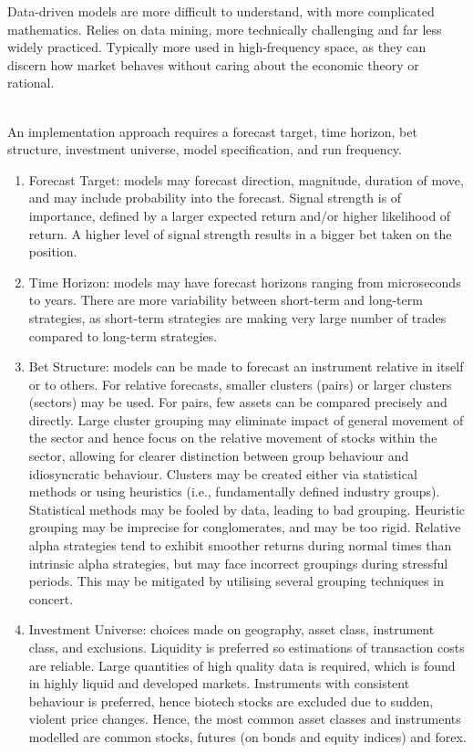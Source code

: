 \documentclass[a4paper,oneside,openany]{book}
\begin{document}
Data-driven models are more difficult to understand, with more complicated mathematics. Relies on data mining, more technically challenging and far less widely practiced. Typically more used in high-frequency space, as they can discern how market behaves without caring about the economic theory or rational.

\begin{method} \\
An implementation approach requires a forecast target, time horizon, bet structure, investment universe, model specification, and run frequency.
\begin{enumerate}[label=\roman*.]
\setlength{\itemsep}{0pt}
\item Forecast Target: models may forecast direction, magnitude, duration of move, and may include probability into the forecast. Signal strength is of importance, defined by a larger expected return and/or higher likelihood of return. A higher level of signal strength results in a bigger bet taken on the position.
\item Time Horizon: models may have forecast horizons ranging from microseconds to years. There are more variability between short-term and long-term strategies, as short-term strategies are making very large number of trades compared to long-term strategies.
\item Bet Structure: models can be made to forecast an instrument relative in itself or to others. For relative forecasts, smaller clusters (pairs) or larger clusters (sectors) may be used. For pairs, few assets can be compared precisely and directly. Large cluster grouping may eliminate impact of general movement of the sector and hence focus on the relative movement of stocks within the sector, allowing for clearer distinction between group behaviour and idiosyncratic behaviour. Clusters may be created either via statistical methods or using heuristics (i.e., fundamentally defined industry groups).\\
Statistical methods may be fooled by data, leading to bad grouping. Heuristic grouping may be imprecise for conglomerates, and may be too rigid. Relative alpha strategies tend to exhibit smoother returns during normal times than intrinsic alpha strategies, but may face incorrect groupings during stressful periods. This may be mitigated by utilising several grouping techniques in concert.
\item Investment Universe: choices made on geography, asset class, instrument class, and exclusions. Liquidity is preferred so estimations of transaction costs are reliable. Large quantities of high quality data is required, which is found in highly liquid and developed markets. Instruments with consistent behaviour is preferred, hence biotech stocks are excluded due to sudden, violent price changes. Hence, the most common asset classes and instruments modelled are common stocks, futures (on bonds and equity indices) and forex.

\end{enumerate}
\end{method}
\end{document}
